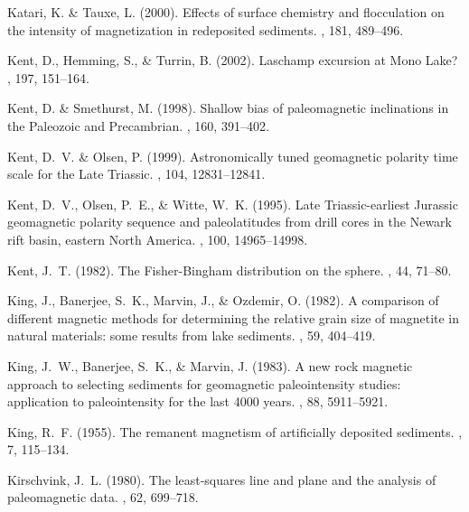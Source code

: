 \documentclass[11pt]{book}
\begin{document}
\begin{thebibliography}{}
Katari, K. \& Tauxe, L. (2000).
\newblock Effects of surface chemistry and flocculation on the intensity of
  magnetization in redeposited sediments.
, 181, 489--496.

Kent, D., Hemming, S., \& Turrin, B. (2002).
\newblock Laschamp excursion at Mono Lake?
, 197, 151--164.

Kent, D. \& Smethurst, M. (1998).
\newblock Shallow bias of paleomagnetic inclinations in the Paleozoic and
  Precambrian.
, 160, 391--402.

Kent, D.~V. \& Olsen, P. (1999).
\newblock Astronomically tuned geomagnetic polarity time scale for the Late
  Triassic.
, 104, 12831--12841.

Kent, D.~V., Olsen, P.~E., \& Witte, W.~K. (1995).
\newblock Late Triassic-earliest Jurassic geomagnetic polarity sequence and
  paleolatitudes from drill cores in the Newark rift basin, eastern North
  America.
, 100, 14965--14998.

Kent, J.~T. (1982).
\newblock The Fisher-Bingham distribution on the sphere.
, 44, 71--80.

King, J., Banerjee, S.~K., Marvin, J., \& Ozdemir, O. (1982).
\newblock A comparison of different magnetic methods for determining the
  relative grain size of magnetite in natural materials: some results from lake
  sediments.
, 59, 404--419.

King, J.~W., Banerjee, S.~K., \& Marvin, J. (1983).
\newblock A new rock magnetic approach to selecting sediments for geomagnetic
  paleointensity studies: application to paleointensity for the last 4000
  years.
, 88, 5911--5921.

King, R.~F. (1955).
\newblock The remanent magnetism of artificially deposited sediments.
, 7, 115--134.

Kirschvink, J.~L. (1980).
\newblock The least-squares line and plane and the analysis of paleomagnetic
  data.
, 62, 699--718.


\end{thebibliography}
\end{document}
